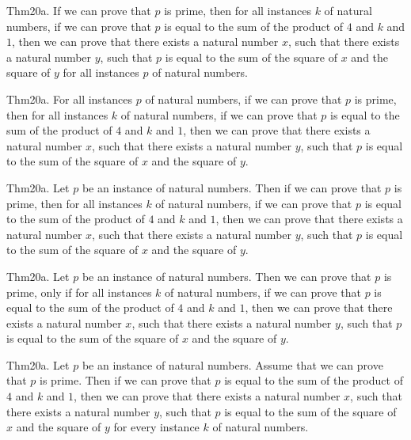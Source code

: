 \documentclass{article}
\begin{document}
Thm20a. If we can prove that $p$ is prime, then for all instances $k$ of natural numbers, if we can prove that $p$ is equal to the sum of the product of $4$ and $k$ and $1$, then we can prove that there exists a natural number $x$, such that there exists a natural number $y$, such that $p$ is equal to the sum of the square of $x$ and the square of $y$ for all instances $p$ of natural numbers.

Thm20a. For all instances $p$ of natural numbers, if we can prove that $p$ is prime, then for all instances $k$ of natural numbers, if we can prove that $p$ is equal to the sum of the product of $4$ and $k$ and $1$, then we can prove that there exists a natural number $x$, such that there exists a natural number $y$, such that $p$ is equal to the sum of the square of $x$ and the square of $y$.

Thm20a. Let $p$ be an instance of natural numbers. Then if we can prove that $p$ is prime, then for all instances $k$ of natural numbers, if we can prove that $p$ is equal to the sum of the product of $4$ and $k$ and $1$, then we can prove that there exists a natural number $x$, such that there exists a natural number $y$, such that $p$ is equal to the sum of the square of $x$ and the square of $y$.

Thm20a. Let $p$ be an instance of natural numbers. Then we can prove that $p$ is prime, only if for all instances $k$ of natural numbers, if we can prove that $p$ is equal to the sum of the product of $4$ and $k$ and $1$, then we can prove that there exists a natural number $x$, such that there exists a natural number $y$, such that $p$ is equal to the sum of the square of $x$ and the square of $y$.

Thm20a. Let $p$ be an instance of natural numbers. Assume that we can prove that $p$ is prime. Then if we can prove that $p$ is equal to the sum of the product of $4$ and $k$ and $1$, then we can prove that there exists a natural number $x$, such that there exists a natural number $y$, such that $p$ is equal to the sum of the square of $x$ and the square of $y$ for every instance $k$ of natural numbers.
\end{document}
